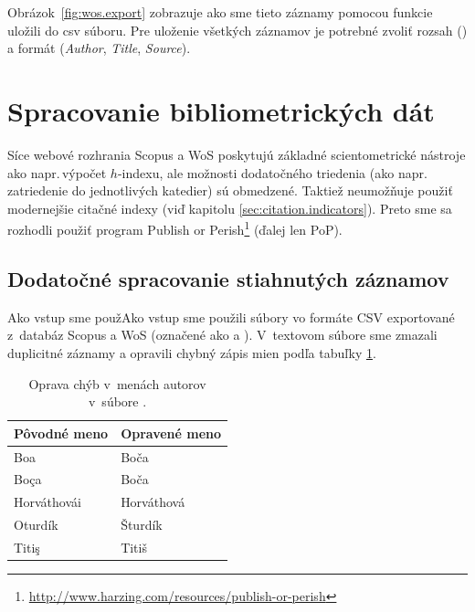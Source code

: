 Obrázok~\ref{fig:wos.export} zobrazuje ako sme tieto záznamy pomocou funkcie
 uložili do csv súboru.  Pre uloženie všetkých
záznamov je potrebné zvoliť rozsah () a formát (\emph{Author},
\emph{Title}, \emph{Source}).


\section{Spracovanie bibliometrických dát}

Síce webové rozhrania Scopus a WoS poskytujú základné scientometrické nástroje
ako napr.\,výpočet $h$-indexu, ale možnosti dodatočného triedenia (ako
napr.\,zatriedenie do jednotlivých katedier) sú obmedzené.  Taktiež neumožňuje
použiť modernejšie citačné indexy (viď kapitolu \ref{sec:citation.indicators}).
Preto sme sa rozhodli použiť program Publish or
Perish\footnote{\url{http://www.harzing.com/resources/publish-or-perish}} (ďalej
len PoP).


\subsection{Dodatočné spracovanie stiahnutých záznamov}

Ako vstup sme použAko vstup sme použili súbory vo formáte CSV exportované
z~databáz Scopus a WoS (označené ako  a
).  V~textovom súbore
 sme zmazali duplicitné záznamy a opravili
chybný zápis mien podľa tabuľky \ref{tab:wos.namecorrections}.

\begin{table}
\centering\small
\begin{tabular}{ll}
  \hline\noalign{\vspace{.3ex}}
  Pôvodné meno & Opravené meno \\[0.3ex]
  \hline\noalign{\vspace{.5ex}}
  Boa          & Boča       \\
  Boça         & Boča       \\
  Horváthovái  & Horváthová \\
  Oturdík      & Šturdík    \\
  Titiş        & Titiš      \\[0.5ex]
  \hline
\end{tabular}
\caption{Oprava chýb v~menách autorov v~súbore .}
\label{tab:wos.namecorrections}
\end{table}

